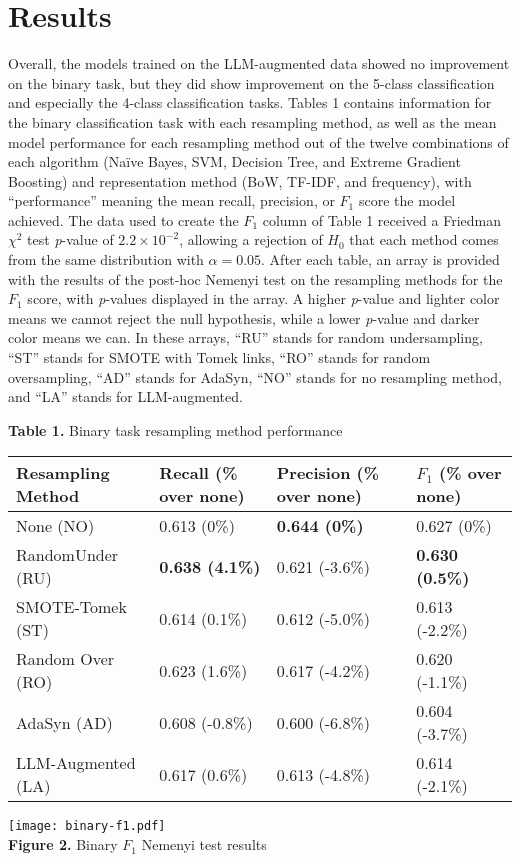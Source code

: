\documentclass[runningheads]{llncs}
\newenvironment{nscenter}
 {\parskip=0pt\par\nopagebreak\centering}
 {\par\noindent\ignorespacesafterend}
\begin{document}
{\parskip=0pt
\section{Results}
Overall, the models trained on the LLM-augmented data showed no improvement on the binary task, but they did show improvement on the 5-class classification and especially the 4-class classification tasks. Tables 1 contains information for the binary classification task with each resampling method, as well as the mean model performance for each resampling method out of the twelve combinations of each algorithm (Naïve Bayes, SVM, Decision Tree, and Extreme Gradient Boosting) and representation method (BoW, TF-IDF, and frequency), with ``performance'' meaning the mean recall, precision, or $F_1$ score the model achieved. The data used to create the $F_1$ column of Table 1 received a Friedman $\chi^2$ test \emph{p}-value of $2.2 \times 10^{-2}$, allowing a rejection of $H_0$ that each method comes from the same distribution with $\alpha=0.05$. After each table, an array is provided with the results of the post-hoc Nemenyi test on the resampling methods for the $F_1$ score, with \emph{p}-values displayed in the array. A higher \emph{p}-value and lighter color means we cannot reject the null hypothesis, while a lower \emph{p}-value and darker color means we can. In these arrays, ``RU'' stands for random undersampling, ``ST'' stands for SMOTE with Tomek links, ``RO'' stands for random oversampling, ``AD'' stands for AdaSyn, ``NO'' stands for no resampling method, and ``LA'' stands for LLM-augmented.}
\begin{nscenter}
{\bf Table 1.} Binary task resampling method performance\\

\begin{tabular}{|l|l|l|l|}
\hline
Resampling Method & Recall (\% over none) & Precision (\% over none) & $F_1$ (\% over none) \\\hline
 None (NO) & 0.613 (0\%) & {\bf 0.644 (0\%)} & 0.627 (0\%) \\\hline
 RandomUnder (RU) & {\bf 0.638 (4.1\%)} & 0.621 (-3.6\%) & {\bf 0.630 (0.5\%)} \\\hline
 SMOTE-Tomek (ST) & 0.614 (0.1\%) & 0.612 (-5.0\%) & 0.613 (-2.2\%) \\\hline
 Random Over (RO) & 0.623 (1.6\%) & 0.617 (-4.2\%) & 0.620 (-1.1\%) \\\hline
 AdaSyn (AD) & 0.608 (-0.8\%) & 0.600 (-6.8\%) & 0.604 (-3.7\%) \\\hline
 LLM-Augmented (LA) & 0.617 (0.6\%) & 0.613 (-4.8\%) & 0.614 (-2.1\%) \\\hline
\end{tabular}

\texttt{[image: binary-f1.pdf]}\\
{\bf Figure 2.} Binary $F_1$ Nemenyi test results\\
\end{nscenter}
\end{document}
